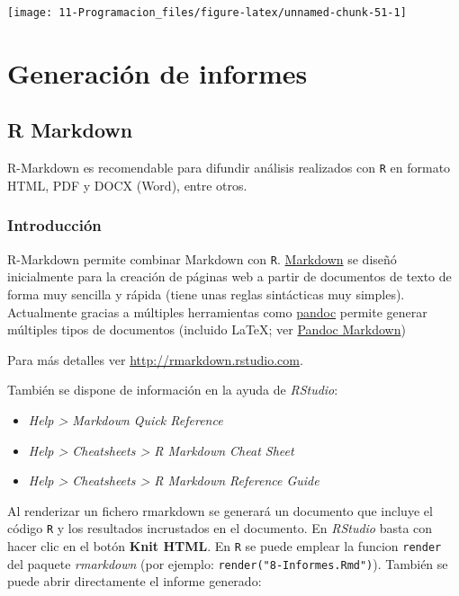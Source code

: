 \documentclass[]{book}
\begin{document}
\begin{center}\texttt{[image: 11-Programacion\_files/figure-latex/unnamed-chunk-51-1]} \end{center}

\chapter{Generación de informes}\label{generacion-de-informes}

\section{R Markdown}\label{r-markdown}

R-Markdown es recomendable para difundir análisis realizados con
\texttt{R} en formato HTML, PDF y DOCX (Word), entre otros.

\subsection{Introducción}\label{introduccion-1}

R-Markdown permite combinar Markdown con \texttt{R}.
\href{http://daringfireball.net/projects/markdown/}{Markdown} se diseñó
inicialmente para la creación de páginas web a partir de documentos de
texto de forma muy sencilla y rápida (tiene unas reglas sintácticas muy
simples). Actualmente gracias a múltiples herramientas como
\href{http://pandoc.org/}{pandoc} permite generar múltiples tipos de
documentos (incluido LaTeX; ver
\href{http://rmarkdown.rstudio.com/authoring_pandoc_markdown.html}{Pandoc
Markdown})

Para más detalles ver \url{http://rmarkdown.rstudio.com}.

También se dispone de información en la ayuda de \emph{RStudio}:

\begin{itemize}
\item
  \emph{Help \textgreater{} Markdown Quick Reference}
\item
  \emph{Help \textgreater{} Cheatsheets \textgreater{} R Markdown Cheat
  Sheet}
\item
  \emph{Help \textgreater{} Cheatsheets \textgreater{} R Markdown
  Reference Guide}
\end{itemize}

Al renderizar un fichero rmarkdown se generará un documento que incluye
el código \texttt{R} y los resultados incrustados en el documento. En
\emph{RStudio} basta con hacer clic en el botón \textbf{Knit HTML}. En
\texttt{R} se puede emplear la funcion \texttt{render} del paquete
\emph{rmarkdown} (por ejemplo: \texttt{render("8-Informes.Rmd")}).
También se puede abrir directamente el informe generado:
\end{document}
